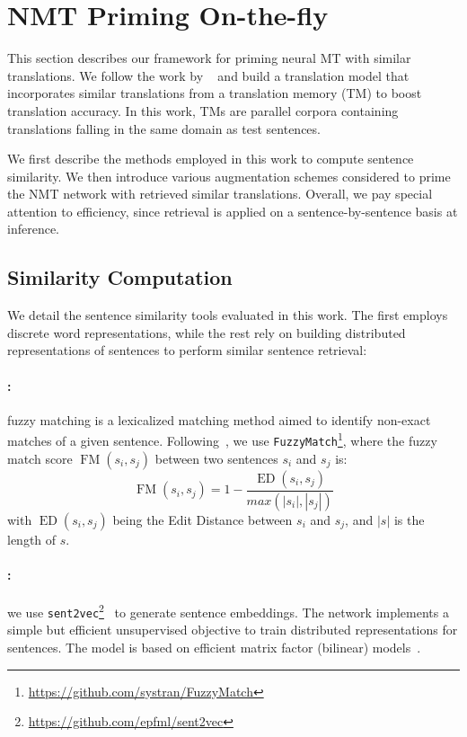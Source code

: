 \section{NMT Priming On-the-fly}
\label{sec:priming}

This section describes our framework for priming neural MT with similar translations. 
We follow the work by ~\cite{bulte19neural,xu20boosting} and build a translation model that incorporates similar translations from a translation memory (TM) to boost translation accuracy. In this work, TMs are parallel corpora containing translations falling in the same domain as test sentences.

We first describe the methods employed in this work to compute sentence similarity. We then introduce various augmentation schemes considered to prime the NMT network with retrieved similar translations. Overall, we pay special attention to efficiency, since retrieval is applied on a sentence-by-sentence basis at inference.

\subsection{Similarity Computation}
\label{ssec:sim}

We detail the sentence similarity tools evaluated in this work. The first employs discrete word representations, while the rest rely on building distributed representations of sentences to perform similar sentence retrieval:


\paragraph{:} fuzzy matching is a lexicalized matching method aimed to identify non-exact matches of a given sentence. Following~\citet{xu20boosting}, we use \texttt{FuzzyMatch}\footnote{\url{https://github.com/systran/FuzzyMatch}}, where the fuzzy match score $\operatorname{FM} (s_i,s_j)$ between two sentences $s_i$ and $s_j$ is:
    \begin{equation*}
    \operatorname{FM} (s_i,s_j) = 1 - \frac{\operatorname{ED} (s_i,s_j)}{max(|s_i|,|s_j|)}
    \label{eq:FM}
    \end{equation*}
    \noindent with $\operatorname{ED}(s_i,s_j)$ being the Edit Distance between $s_i$ and $s_j$, and $|s|$ is the length of $s$. 
\paragraph{:} we use \texttt{sent2vec}\footnote{\url{https://github.com/epfml/sent2vec}}~\cite{pagliardini18unsupervised} to generate sentence embeddings. The network implements a simple but efficient unsupervised objective to train distributed representations for sentences. 
The model is based on efficient matrix factor (bilinear) models~\cite{Mikolov13efficient,Mikolov13distributed,Pennington14glove}.

